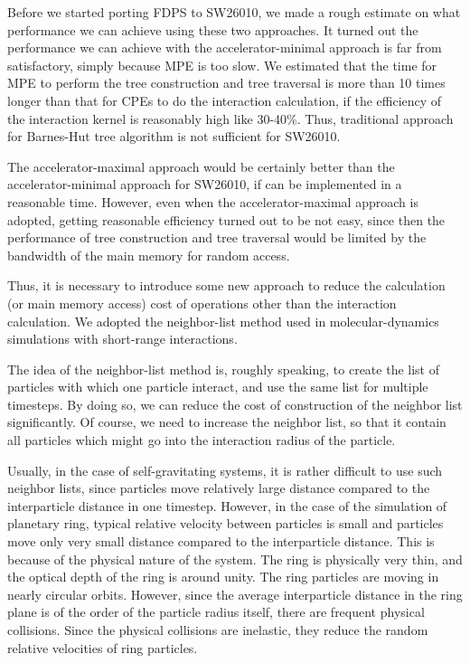 \documentclass[sigconf]{acmart}
\begin{document}
Before we started porting FDPS to SW26010, we made a rough estimate on
what performance we can achieve using these two approaches. It turned
out the performance we can achieve with the accelerator-minimal
approach is far from satisfactory, simply because  MPE is too slow. We
estimated that the time for MPE to perform the tree construction and
tree traversal is more than 10 times longer than that for CPEs to do
the interaction calculation, if the efficiency of the interaction
kernel is reasonably high like 30-40\%. Thus, traditional approach for
Barnes-Hut tree algorithm is not sufficient for SW26010. 

The accelerator-maximal approach would be certainly better than 
the accelerator-minimal approach for SW26010, if can be implemented in
a reasonable time. However, even when the accelerator-maximal approach
is adopted, getting reasonable efficiency turned out to be not easy,
since then the performance of tree construction and tree traversal
would be limited by the bandwidth of the main memory for random
access.

Thus, it is necessary to introduce some new approach to reduce the
calculation (or main memory access) cost of operations other than the
interaction calculation.  We adopted the neighbor-list method used
in molecular-dynamics simulations with short-range interactions.

The idea of the neighbor-list method is, roughly speaking, to create
the list of particles with which one particle interact, and use the
same list for multiple timesteps. By doing so, we can reduce the cost
of construction of the neighbor list significantly. Of course, we
need to increase the neighbor list, so that it contain all particles
which might go into the interaction radius of the particle.

Usually, in the case of self-gravitating systems, it is rather
difficult to use such neighbor lists, since particles move relatively
large distance compared to the interparticle distance in one timestep.
However, in the case of the simulation of planetary ring, typical
relative velocity between particles is small and particles move only
very small distance compared to the interparticle distance. This is
because of the physical nature of the system. The ring is physically
very thin, and the optical depth of the ring is around unity. The ring
particles are moving in nearly circular orbits. However, since the
average interparticle distance in the ring plane is of the order of
the particle radius itself, there are frequent physical
collisions. Since the physical collisions are inelastic, they reduce
the random relative velocities of ring particles.
\end{document}
